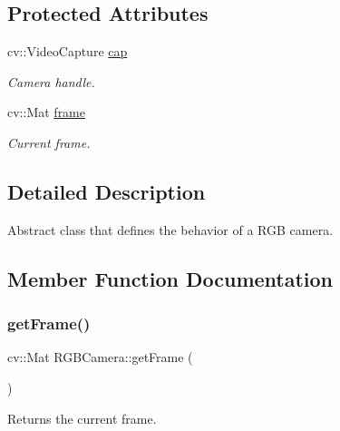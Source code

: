 \subsection*{Protected Attributes}
\begin{DoxyCompactItemize}
\item 
\hypertarget{class_r_g_b_camera_a941480d7209fdae8f0ac410cb6b90a63}{}\label{class_r_g_b_camera_a941480d7209fdae8f0ac410cb6b90a63} 
cv\+::\+Video\+Capture \hyperlink{class_r_g_b_camera_a941480d7209fdae8f0ac410cb6b90a63}{cap}
\begin{DoxyCompactList}\small\item\em Camera handle. \end{DoxyCompactList}\item 
\hypertarget{class_r_g_b_camera_a81487c499dd5eee3c573ec6ed721ceba}{}\label{class_r_g_b_camera_a81487c499dd5eee3c573ec6ed721ceba} 
cv\+::\+Mat \hyperlink{class_r_g_b_camera_a81487c499dd5eee3c573ec6ed721ceba}{frame}
\begin{DoxyCompactList}\small\item\em Current frame. \end{DoxyCompactList}\end{DoxyCompactItemize}


\subsection{Detailed Description}
Abstract class that defines the behavior of a R\+GB camera. 

\subsection{Member Function Documentation}
\hypertarget{class_r_g_b_camera_a4db0620e9346039530f248fbb7130212}{}\label{class_r_g_b_camera_a4db0620e9346039530f248fbb7130212} 
\subsubsection{\texorpdfstring{get\+Frame()}{getFrame()}}
{\footnotesize\ttfamily cv\+::\+Mat R\+G\+B\+Camera\+::get\+Frame (\begin{DoxyParamCaption}{ }\end{DoxyParamCaption})}



Returns the current frame. 

